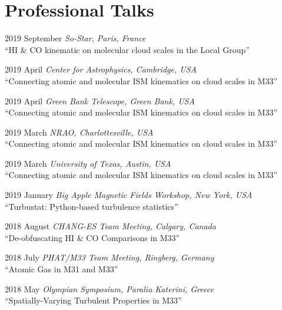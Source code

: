 \documentclass[letterpaper,11pt]{article}
\newlength{\mainindent} \setlength{\mainindent}{12pt}
\newlength{\contentindent} \setlength{\contentindent}{19ex}
\newenvironment{datelist}{
  \begingroup
  \raggedright
  \begin{description}[labelindent=\mainindent,leftmargin=\contentindent,
      style=sameline,font=\normalfont,topsep=0pt,partopsep=0pt,parsep=0pt,
      itemsep=4pt]
}{
  \end{description}
  \endgroup
}
\begin{document}





\section*{Professional Talks}
\begin{datelist}
\item[2019 September] \emph{So-Star, Paris, France} \\ ``HI \& CO kinematic on molecular cloud scales in the Local Group''
\item[2019 April] \emph{Center for Astrophysics, Cambridge, USA} \\ ``Connecting atomic and molecular ISM kinematics on cloud scales in M33''
\item[2019 April] \emph{Green Bank Telescope, Green Bank, USA} \\ ``Connecting atomic and molecular ISM kinematics on cloud scales in M33''
\item[2019 March] \emph{NRAO, Charlottesville, USA} \\ ``Connecting atomic and molecular ISM kinematics on cloud scales in M33''
\item[2019 March] \emph{University of Texas, Austin, USA} \\ ``Connecting atomic and molecular ISM kinematics on cloud scales in M33''
\item[2019 January] \emph{Big Apple Magnetic Fields Workshop, New York, USA} \\ ``Turbustat: Python-based turbulence statistics''
\item[2018 August] \emph{CHANG-ES Team Meeting, Calgary, Canada} \\ ``De-obfuscating HI \& CO Comparisons in M33''
\item[2018 July] \emph{PHAT/M33 Team Meeting, Ringberg, Germany} \\ ``Atomic Gas in M31 and M33''
\item[2018 May] \emph{Olympian Symposium, Paralia Katerini, Greece} \\ ``Spatially-Varying Turbulent Properties in M33''

\end{datelist}
\end{document}
